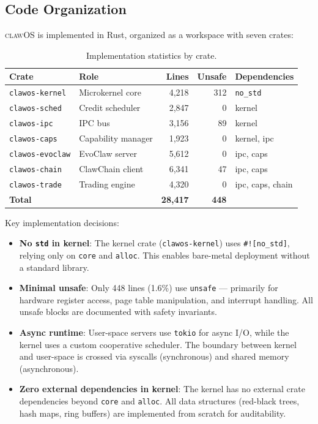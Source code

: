 \documentclass{article}
\newcommand{\clawos}{\textsc{clawOS}}
\begin{document}
\subsection{Code Organization}

\clawos{} is implemented in Rust, organized as a workspace with seven crates:

\begin{table}[t]
\caption{Implementation statistics by crate.}
\label{tab:implementation}
\centering
\small
\begin{tabular}{llrrl}
\toprule
\textbf{Crate} & \textbf{Role} & \textbf{Lines} & \textbf{Unsafe} & \textbf{Dependencies} \\
\midrule
\texttt{clawos-kernel} & Microkernel core & 4,218 & 312 & \texttt{no\_std} \\
\texttt{clawos-sched} & Credit scheduler & 2,847 & 0 & kernel \\
\texttt{clawos-ipc} & IPC bus & 3,156 & 89 & kernel \\
\texttt{clawos-caps} & Capability manager & 1,923 & 0 & kernel, ipc \\
\texttt{clawos-evoclaw} & EvoClaw server & 5,612 & 0 & ipc, caps \\
\texttt{clawos-chain} & ClawChain client & 6,341 & 47 & ipc, caps \\
\texttt{clawos-trade} & Trading engine & 4,320 & 0 & ipc, caps, chain \\
\midrule
\textbf{Total} & & \textbf{28,417} & \textbf{448} & \\
\bottomrule
\end{tabular}
\end{table}

Key implementation decisions:

\begin{itemize}[leftmargin=*]
    \item \textbf{No \texttt{std} in kernel}: The kernel crate (\texttt{clawos-kernel}) uses \texttt{\#![no\_std]}, relying only on \texttt{core} and \texttt{alloc}. This enables bare-metal deployment without a standard library.
    
    \item \textbf{Minimal unsafe}: Only 448 lines (1.6\%) use \texttt{unsafe} — primarily for hardware register access, page table manipulation, and interrupt handling. All unsafe blocks are documented with safety invariants.
    
    \item \textbf{Async runtime}: User-space servers use \texttt{tokio} for async I/O, while the kernel uses a custom cooperative scheduler. The boundary between kernel and user-space is crossed via syscalls (synchronous) and shared memory (asynchronous).
    
    \item \textbf{Zero external dependencies in kernel}: The kernel has no external crate dependencies beyond \texttt{core} and \texttt{alloc}. All data structures (red-black trees, hash maps, ring buffers) are implemented from scratch for auditability.
\end{itemize}
\end{document}
